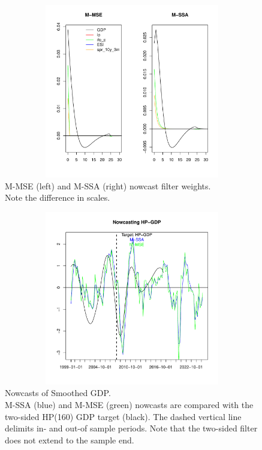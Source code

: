 \documentclass[11pt,a4paper]{article}
\begin{document}
\begin{figure}[htpb]
    \begin{center}
        \includegraphics[height=3in, width=4.5in]{./Figures/bk_gammak.pdf}
        \caption{M-MSE (left) and M-SSA (right) nowcast filter weights.\\
        Note the difference in scales.
        \label{fig:bk_gammak}}
    \end{center}
\end{figure}

\begin{figure}[htpb]
    \begin{center}
        \includegraphics[height=3in, width=4.5in]{./Figures/mssa_msse_now.pdf}
        \caption{Nowcasts of Smoothed GDP.\\
        M-SSA (blue) and M-MSE (green) nowcasts are compared with the two-sided HP(160) GDP target (black). The dashed vertical line delimits in- and out-of sample periods. 
        Note that the two-sided filter does not extend to the sample end.
        \label{fig:mssa_msse_now}}
    \end{center}
\end{figure}
\end{document}
